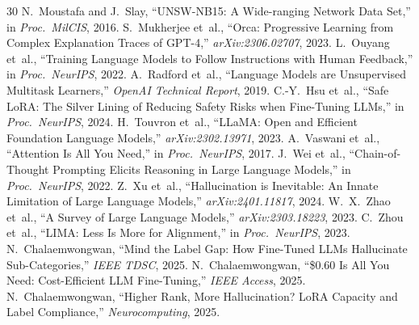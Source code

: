\documentclass[review,3p]{elsarticle}
\begin{document}
\begin{thebibliography}{30}
 N.~Moustafa and J.~Slay, ``UNSW-NB15: A Wide-ranging Network Data Set,'' in \emph{Proc.\ MilCIS}, 2016.
 S.~Mukherjee et~al., ``Orca: Progressive Learning from Complex Explanation Traces of GPT-4,'' \emph{arXiv:2306.02707}, 2023.
 L.~Ouyang et~al., ``Training Language Models to Follow Instructions with Human Feedback,'' in \emph{Proc.\ NeurIPS}, 2022.
 A.~Radford et~al., ``Language Models are Unsupervised Multitask Learners,'' \emph{OpenAI Technical Report}, 2019.
 C.-Y.~Hsu et~al., ``Safe LoRA: The Silver Lining of Reducing Safety Risks when Fine-Tuning LLMs,'' in \emph{Proc.\ NeurIPS}, 2024.
 H.~Touvron et~al., ``LLaMA: Open and Efficient Foundation Language Models,'' \emph{arXiv:2302.13971}, 2023.
 A.~Vaswani et~al., ``Attention Is All You Need,'' in \emph{Proc.\ NeurIPS}, 2017.
 J.~Wei et~al., ``Chain-of-Thought Prompting Elicits Reasoning in Large Language Models,'' in \emph{Proc.\ NeurIPS}, 2022.
 Z.~Xu et~al., ``Hallucination is Inevitable: An Innate Limitation of Large Language Models,'' \emph{arXiv:2401.11817}, 2024.
 W.~X.~Zhao et~al., ``A Survey of Large Language Models,'' \emph{arXiv:2303.18223}, 2023.
 C.~Zhou et~al., ``LIMA: Less Is More for Alignment,'' in \emph{Proc.\ NeurIPS}, 2023.
 N.~Chalaemwongwan, ``Mind the Label Gap: How Fine-Tuned LLMs Hallucinate Sub-Categories,'' \emph{IEEE TDSC}, 2025.
 N.~Chalaemwongwan, ``\$0.60 Is All You Need: Cost-Efficient LLM Fine-Tuning,'' \emph{IEEE Access}, 2025.
 N.~Chalaemwongwan, ``Higher Rank, More Hallucination? LoRA Capacity and Label Compliance,'' \emph{Neurocomputing}, 2025.
\end{thebibliography}
\end{document}
